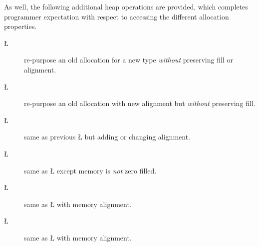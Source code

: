 \documentclass[openright,twoside]{report}
\begin{document}
As well, the following additional heap operations are provided, which completes programmer expectation with respect to accessing the different allocation properties.
\begin{description}
\item[\LGinlinetrue\LGbegin\lgrinde\L{}\endlgrinde\LGend{}] re-purpose an old allocation for a new type \emph{without} preserving fill or alignment.
\item[\LGinlinetrue\LGbegin\lgrinde\L{}\endlgrinde\LGend{}] re-purpose an old allocation with new alignment but \emph{without} preserving fill.
\item[\LGinlinetrue\LGbegin\lgrinde\L{}\endlgrinde\LGend{}] same as previous \LGinlinetrue\LGbegin\lgrinde\L{}\endlgrinde\LGend{} but adding or changing alignment.
\item[\LGinlinetrue\LGbegin\lgrinde\L{}\endlgrinde\LGend{}] same as \LGinlinetrue\LGbegin\lgrinde\L{}\endlgrinde\LGend{} except memory is \emph{not} zero filled.
\item[\LGinlinetrue\LGbegin\lgrinde\L{}\endlgrinde\LGend{}] same as \LGinlinetrue\LGbegin\lgrinde\L{}\endlgrinde\LGend{} with memory alignment.
\item[\LGinlinetrue\LGbegin\lgrinde\L{}\endlgrinde\LGend{}] same as \LGinlinetrue\LGbegin\lgrinde\L{}\endlgrinde\LGend{} with memory alignment.
\end{description}
\end{document}
